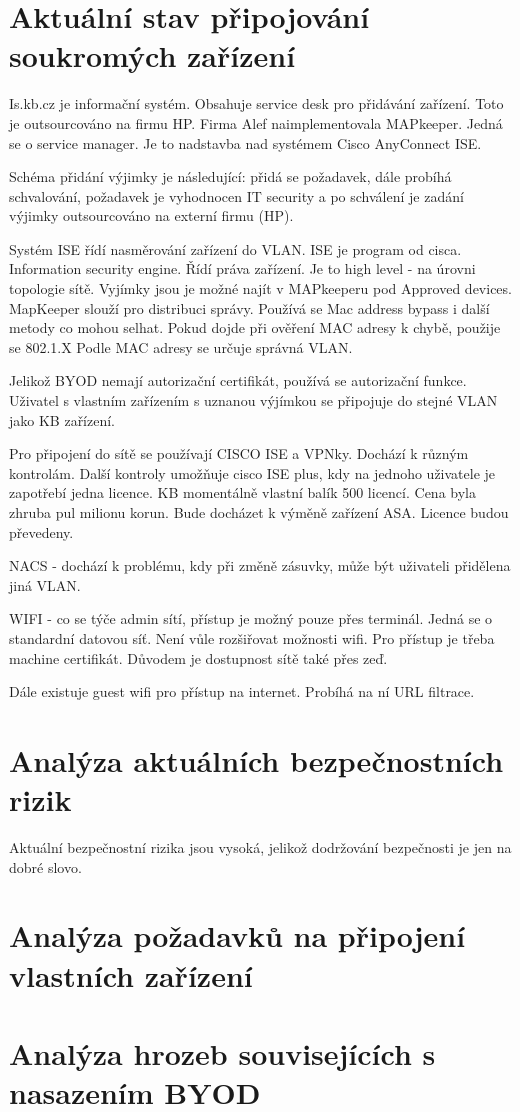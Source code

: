 

\section{Aktuální stav připojování soukromých zařízení}

Is.kb.cz je informační systém. Obsahuje service desk pro přidávání zařízení. Toto je outsourcováno na firmu HP. Firma Alef naimplementovala MAPkeeper. Jedná se o service manager. Je to nadstavba nad systémem Cisco AnyConnect ISE.


Schéma přidání výjimky je následující: přidá se požadavek, dále probíhá schvalování, požadavek je vyhodnocen IT security a po schválení je zadání výjimky outsourcováno na externí firmu (HP).

Systém ISE řídí nasměrování zařízení do VLAN. ISE je program od cisca. Information security engine. Řídí práva zařízení. Je to high level - na úrovni topologie sítě. Vyjímky jsou je možné najít v MAPkeeperu pod Approved devices. MapKeeper slouží pro distribuci správy. Používá se Mac address bypass i další metody co mohou selhat. Pokud dojde při ověření MAC adresy k chybě, použije se  802.1.X  Podle MAC adresy se určuje správná VLAN.

Jelikož BYOD nemají autorizační certifikát, používá se autorizační funkce. Uživatel s vlastním zařízením s uznanou výjímkou se připojuje do stejné VLAN jako KB zařízení.


Pro připojení do sítě se používají CISCO ISE a VPNky. Dochází k různým kontrolám.
Další kontroly umožňuje cisco ISE plus, kdy na jednoho uživatele je zapotřebí jedna licence. KB momentálně vlastní balík 500 licencí. Cena byla zhruba pul milionu korun. Bude docházet k výměně zařízení ASA. Licence budou převedeny.


NACS - dochází k problému, kdy při změně zásuvky, může být uživateli přidělena jiná VLAN.


WIFI - co se týče admin sítí, přístup je možný pouze přes terminál. Jedná se o standardní datovou síť. Není vůle rozšiřovat možnosti wifi. Pro přístup je třeba machine certifikát. Důvodem je dostupnost sítě také přes zeď.

Dále existuje guest wifi pro přístup na internet. Probíhá na ní URL filtrace.


\section{Analýza aktuálních bezpečnostních rizik}
Aktuální bezpečnostní rizika jsou vysoká, jelikož dodržování bezpečnosti je jen na dobré slovo. 

\section{Analýza požadavků na připojení vlastních zařízení} 

\section{Analýza hrozeb souvisejících s nasazením BYOD}
